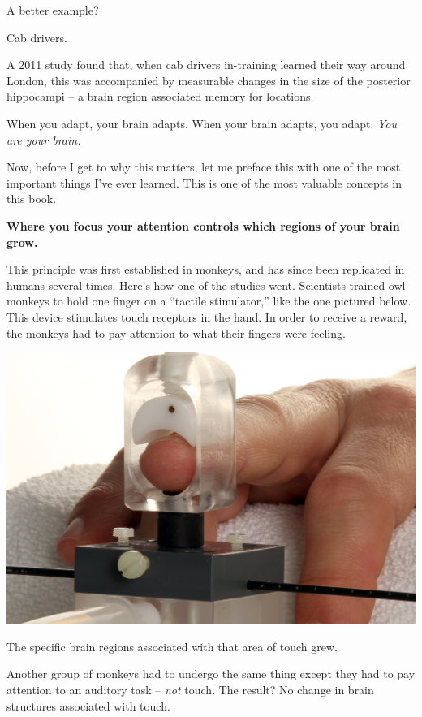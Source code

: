 A better example?

Cab drivers.

A 2011 study found that, when cab drivers in-training learned their way around
London, this was accompanied by measurable changes in the size of the posterior
hippocampi -- a brain region associated memory for locations. \cite{woollett2011acquiring}

When you adapt, your brain adapts. When your brain adapts, you adapt. \textit{You are
your brain.}

Now, before I get to why this matters, let me preface this with one of the most
important things I've ever learned. This is one of the most valuable concepts in this
book. 

\textbf{Where you focus your attention controls which regions of your brain
  grow.}

This principle was first established in monkeys, and has since been replicated
in humans several times.\cite{heron2010attention}\cite{stefan2004modulation} Here's how one of the studies\cite{recanzone1992topographic} went. Scientists trained owl
monkeys to hold one finger on a ``tactile stimulator,'' like the one pictured below. This
device stimulates touch receptors in the hand. In order to receive a reward, the monkeys
had to pay attention to what their fingers were feeling.

\includegraphics[width=\textwidth]{graphics/tactile-simulator.jpg}

The specific brain regions associated with that area of touch grew.

Another group of monkeys had to undergo the same thing except they had to
pay attention to an auditory task -- \textit{not} touch. The result? No change in brain structures
associated with touch.


